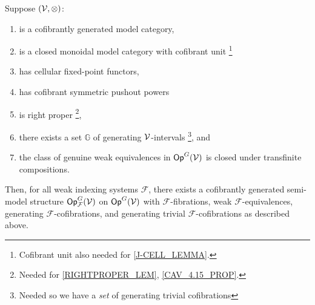 \documentclass[a4paper,10pt
,draft
]{article}%
\renewcommand{\F}{\mathcal F}
\renewcommand{\1}{\ensuremath{\mathbb{id}}}
\begin{document}
\begin{theorem}
      \label{MODEL_THEOREM}
      Suppose $(\mathcal V, \otimes)$:
      \begin{enumerate}[label = (\roman*)]
      \item is a cofibrantly generated model category,
      \item is a closed monoidal model category with cofibrant unit \footnote{Cofibrant unit also needed for \ref{J-CELL_LEMMA}.}
      \item has cellular fixed-point functors,
      \item has cofibrant symmetric pushout powers
      \item is right proper
            \footnote{Needed for \ref{RIGHTPROPER_LEM}, \ref{CAV_4.15_PROP}.},
      \item there exists a set $\mathbb{G}$ of generating $\mathcal V$-intervals
            \footnote{Needed so we have a \textit{set} of generating trivial cofibrations}, and
      \item the class of genuine weak equivalences in $\mathsf{Op}^G(\mathcal V)$ is closed under transfinite compositions.
      \end{enumerate}
      Then, for all weak indexing systems $\F$,
      there exists a cofibrantly generated semi-model structure $\Op^G_\F(\V)$ on $\mathsf{Op}^G(\mathcal V)$ with
      $\F$-fibrations, weak $\F$-equivalences, generating $\F$-cofibrations, and generating trivial $\F$-cofibrations as described above.
\end{theorem}
\end{document}

